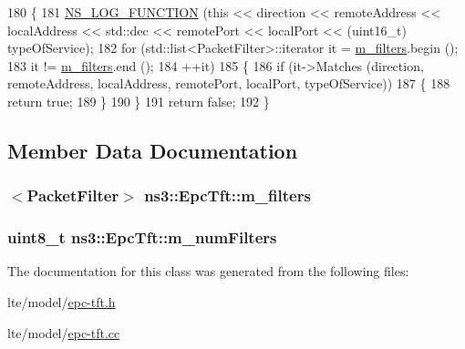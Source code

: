\begin{DoxyCode}
180 \{
181   \hyperlink{log-macros-disabled_8h_a90b90d5bad1f39cb1b64923ea94c0761}{NS\_LOG\_FUNCTION} (\textcolor{keyword}{this} << direction << remoteAddress << localAddress << std::dec << 
      remotePort << localPort << (uint16\_t) typeOfService);
182   \textcolor{keywordflow}{for} (std::list<PacketFilter>::iterator it = \hyperlink{classns3_1_1EpcTft_a7310a580f93a164bba5e78563fcbf1e3}{m\_filters}.begin ();
183        it != \hyperlink{classns3_1_1EpcTft_a7310a580f93a164bba5e78563fcbf1e3}{m\_filters}.end ();
184        ++it)
185     \{
186       \textcolor{keywordflow}{if} (it->Matches (direction, remoteAddress, localAddress, remotePort, localPort, typeOfService))
187         \{
188           \textcolor{keywordflow}{return} \textcolor{keyword}{true};
189         \}
190     \}  
191   \textcolor{keywordflow}{return} \textcolor{keyword}{false};
192 \}
\end{DoxyCode}


\subsection{Member Data Documentation}
\subsubsection[{\texorpdfstring{m\+\_\+filters}{m_filters}}]{$<${\bf Packet\+Filter}$>$ ns3\+::\+Epc\+Tft\+::m\+\_\+filters\hspace{0.3cm}{\ttfamily [private]}}\hypertarget{classns3_1_1EpcTft_a7310a580f93a164bba5e78563fcbf1e3}{}\label{classns3_1_1EpcTft_a7310a580f93a164bba5e78563fcbf1e3}
\subsubsection[{\texorpdfstring{m\+\_\+num\+Filters}{m_numFilters}}]{\setlength{\rightskip}{0pt plus 5cm}uint8\+\_\+t ns3\+::\+Epc\+Tft\+::m\+\_\+num\+Filters\hspace{0.3cm}{\ttfamily [private]}}\hypertarget{classns3_1_1EpcTft_a86b3c690c3503dff761f01d5edc501e1}{}\label{classns3_1_1EpcTft_a86b3c690c3503dff761f01d5edc501e1}


The documentation for this class was generated from the following files\+:\begin{DoxyCompactItemize}
\item 
lte/model/\hyperlink{epc-tft_8h}{epc-\/tft.\+h}\item 
lte/model/\hyperlink{epc-tft_8cc}{epc-\/tft.\+cc}\end{DoxyCompactItemize}

